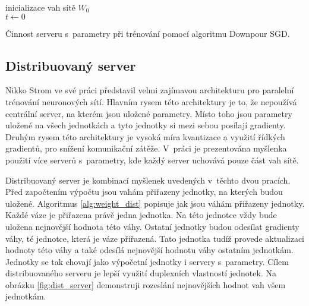 \begin{algorithm}
    \SetAlgoLined
    inicializace vah sítě $W_0$\\
    $t \leftarrow 0$\\
\caption{Činnost serveru s~parametry při trénování pomocí algoritmu Downpour SGD.}
\label{alg:async_server}
\end{algorithm}

\subsection{Distribuovaný server}
\label{sub:dist_server}

Nikko Strom ve své práci \cite{Strom2015} představil velmi zajímavou architekturu pro paralelní trénování neuronových sítí.
Hlavním rysem této architektury je to, že nepoužívá centrální server, na kterém jsou uložené parametry.
Místo toho jsou parametry uložené na všech jednotkách a tyto jednotky si mezi sebou posílají gradienty.
Druhým rysem této architektury je vysoká míra kvantizace a využití řídkých gradientů, pro snížení komunikační zátěže.
V~práci \cite{Dean2012} je prezentována myšlenka použití více serverů s~parametry, kde každý server uchovává pouze část vah sítě.

Distribuovaný server je kombinací myšlenek uvedených v~těchto dvou pracích.
Před započtením výpočtu jsou vahám přiřazeny jednotky, na kterých budou uložené.
Algoritmus \ref{alg:weight_dist} popisuje jak jsou váhám přiřazeny jednotky.
Každé váze je přiřazena právě jedna jednotka.
Na této jednotce vždy bude uložena nejnovější hodnota této váhy.
Ostatní jednotky budou odesílat gradienty váhy, té jednotce, která je váze přiřazená.
Tato jednotka tudíž provede aktualizaci hodnoty této váhy a také odesílá nejnovější hodnotu váhy ostatním jednotkám.
Jednotky se tak chovají jako výpočetní jednotky i servery s~parametry.
Cílem distribuovaného serveru je lepší využití duplexních vlastností jednotek.
Na obrázku \ref{fig:dist_server} demonstruji rozeslání nejnovějších hodnot vah všem jednotkám.

